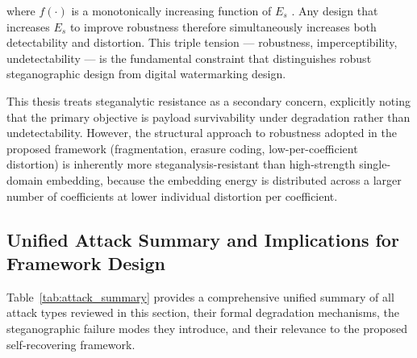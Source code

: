 \documentclass[12pt,a4paper,oneside]{report}
\begin{document}
	where $f(\cdot)$ is a monotonically increasing function of $E_s$ \cite{Fridrich2012}.
	Any design that increases $E_s$ to improve robustness therefore simultaneously increases
	both detectability and distortion. This triple tension — robustness, imperceptibility,
	undetectability — is the fundamental constraint that distinguishes robust steganographic
	design from digital watermarking design.
	
	This thesis treats steganalytic resistance as a secondary concern, explicitly noting that
	the primary objective is payload survivability under degradation rather than undetectability.
	However, the structural approach to robustness adopted in the proposed framework
	(fragmentation, erasure coding, low-per-coefficient distortion) is inherently more
	steganalysis-resistant than high-strength single-domain embedding, because the embedding
	energy is distributed across a larger number of coefficients at lower individual distortion
	per coefficient.
	
	\subsection{Unified Attack Summary and Implications for Framework Design}
	\label{subsec:attack_summary}
	
	Table~\ref{tab:attack_summary} provides a comprehensive unified summary of all attack types
	reviewed in this section, their formal degradation mechanisms, the steganographic failure
	modes they introduce, and their relevance to the proposed self-recovering framework.
	
\end{document}
